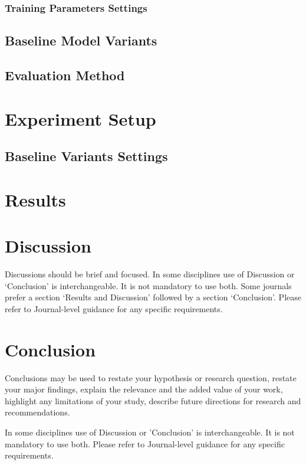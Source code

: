 \documentclass[default,pdflatex,iicol]{sn-jnl}%
\begin{document}
\subsubsection{Training Parameters Settings}
\subsection{Baseline Model Variants}
\subsection{Evaluation Method}

\section{Experiment Setup}
\subsection{Baseline Variants Settings}

\section{Results}




\section{Discussion}

Discussions should be brief and focused. In some disciplines use of Discussion or `Conclusion' is interchangeable. It is not mandatory to use both. Some journals prefer a section `Results and Discussion' followed by a section `Conclusion'. Please refer to Journal-level guidance for any specific requirements. 

\section{Conclusion}

Conclusions may be used to restate your hypothesis or research question, restate your major findings, explain the relevance and the added value of your work, highlight any limitations of your study, describe future directions for research and recommendations. 

In some disciplines use of Discussion or 'Conclusion' is interchangeable. It is not mandatory to use both. Please refer to Journal-level guidance for any specific requirements. 
\end{document}
